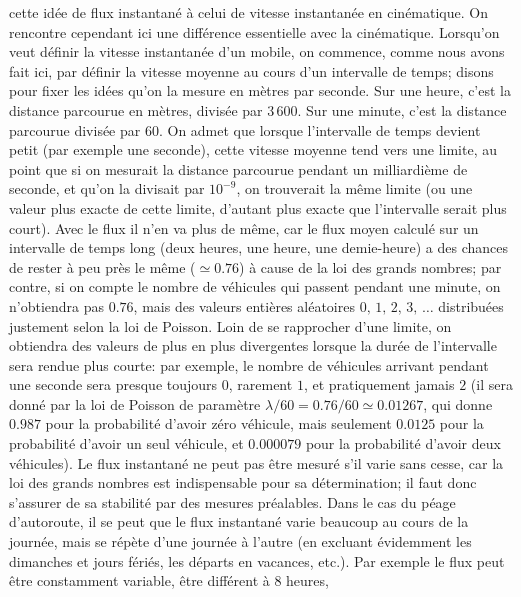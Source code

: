 cette id\'ee de flux instantan\'e \`a celui de vitesse instantan\'ee
en cin\'ematique.  On rencontre cependant ici une diff\'erence
essentielle avec la cin\'ematique.  
\medskip
Lorsqu'on veut d\'efinir la vitesse instantan\'ee d'un mobile, 
on commence,  comme nous avons fait ici,  par d\'efinir la vitesse
moyenne au cours d'un intervalle de temps;  disons pour fixer les
id\'ees qu'on la mesure en m\`etres par seconde.  Sur une heure, 
c'est la distance parcourue en m\`etres, divis\'ee par $3\, 600$. 
Sur une minute,  c'est la distance parcourue divis\'ee par $60$. 
On admet que lorsque l'intervalle de temps devient petit (par exemple
une seconde),  cette vitesse moyenne tend vers une limite,  au point
que si on mesurait la distance parcourue pendant un milliardi\`eme
de seconde,  et qu'on la divisait par $10^{-9}$,  on trouverait la
m\^eme limite (ou une valeur plus exacte de cette limite, d'autant
plus exacte que l'intervalle serait plus court).  Avec le flux il n'en
va plus de m\^eme, car le flux moyen calcul\'e sur un intervalle de
temps long (deux heures, une heure, une demie-heure)  a des chances de
rester \`a peu pr\`es le m\^eme ($\simeq 0.76$) \`a cause de la loi
des grands nombres;  par contre,  si on compte le nombre de v\'ehicules
qui passent pendant une minute,  on n'obtiendra pas $0.76$,  mais des
valeurs enti\`eres al\'eatoires $0,\, 1,\, 2,\, 3,\, \ldots$ distribu\'ees
justement  selon la loi de Poisson.  Loin de se rapprocher d'une limite, 
on obtiendra des valeurs de plus en plus divergentes lorsque la dur\'ee
de l'intervalle sera rendue plus courte:  par exemple,  le nombre de
v\'ehicules arrivant pendant une seconde sera presque toujours $0$, 
rarement $1$,  et pratiquement jamais $2$ (il sera donn\'e par la loi
de Poisson de param\`etre $\lambda/60 = 0.76 / 60 \simeq 0.01267$, 
qui donne $0.987$ pour la probabilit\'e d'avoir z\'ero v\'ehicule, 
mais seulement $0.0125$ pour la probabilit\'e d'avoir un seul v\'ehicule, 
et $0.000079$ pour la probabilit\'e d'avoir deux v\'ehicules).      
\medskip 
Le flux instantan\'e ne peut pas \^etre mesur\'e s'il varie sans  
cesse, car la loi des grands nombres est indispensable pour sa 
d\'etermination; il faut donc s'assurer de sa stabilit\'e par des mesures 
pr\'ealables. Dans le cas du p\'eage d'autoroute, il se peut que le flux 
instantan\'e varie beaucoup au cours de la journ\'ee, mais se r\'ep\`ete 
d'une journ\'ee \`a l'autre (en excluant \'evidemment les dimanches et 
jours f\'eri\'es, les d\'eparts en vacances, etc.). Par exemple le flux 
peut \^etre constamment variable, \^etre diff\'erent \`a $8$ heures,  
